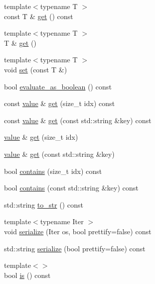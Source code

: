 \begin{DoxyCompactItemize}
\item 
{\footnotesize template$<$typename T $>$ }\\const T \& \hyperlink{classpicojson_1_1value_a6a1099de1eb4f070445dc3eadb843a92}{get} () const
\item 
{\footnotesize template$<$typename T $>$ }\\T \& \hyperlink{classpicojson_1_1value_a94f71153b3d14df524397a5cafcef2fc}{get} ()
\item 
{\footnotesize template$<$typename T $>$ }\\void \hyperlink{classpicojson_1_1value_a5349fff183e52146f2835d7fa0a10358}{set} (const T \&)
\item 
bool \hyperlink{classpicojson_1_1value_a389873791af4898a52edc12b967a543f}{evaluate\+\_\+as\+\_\+boolean} () const
\item 
const \hyperlink{classpicojson_1_1value}{value} \& \hyperlink{classpicojson_1_1value_a6070daccb2b8cb44e6ab62137b2f5a9d}{get} (size\+\_\+t idx) const
\item 
const \hyperlink{classpicojson_1_1value}{value} \& \hyperlink{classpicojson_1_1value_aafe8fe780ae3b149bb7bd353e39d6f29}{get} (const std\+::string \&key) const
\item 
\hyperlink{classpicojson_1_1value}{value} \& \hyperlink{classpicojson_1_1value_adf5edc5f70df6a5ebe78bb32c2ba3e91}{get} (size\+\_\+t idx)
\item 
\hyperlink{classpicojson_1_1value}{value} \& \hyperlink{classpicojson_1_1value_a72f3216a2536e4e088e70b0f1617fc11}{get} (const std\+::string \&key)
\item 
bool \hyperlink{classpicojson_1_1value_a2d694ee5607fe8ff865fb39c92ef8bdb}{contains} (size\+\_\+t idx) const
\item 
bool \hyperlink{classpicojson_1_1value_a67fed7e1effed5c14fdb7f912f933842}{contains} (const std\+::string \&key) const
\item 
std\+::string \hyperlink{classpicojson_1_1value_a005099b2865752cf31b7ced33bd85f59}{to\+\_\+str} () const
\item 
{\footnotesize template$<$typename Iter $>$ }\\void \hyperlink{classpicojson_1_1value_a23664084ed4a8ecbfda901484de34bbc}{serialize} (Iter os, bool prettify=false) const
\item 
std\+::string \hyperlink{classpicojson_1_1value_ad5fa91c040826e85855678db9258238d}{serialize} (bool prettify=false) const
\item 
{\footnotesize template$<$$>$ }\\bool \hyperlink{classpicojson_1_1value_a0b3fb432ea49151f8787026e8f8c0801}{is} () const
\end{DoxyCompactItemize}
